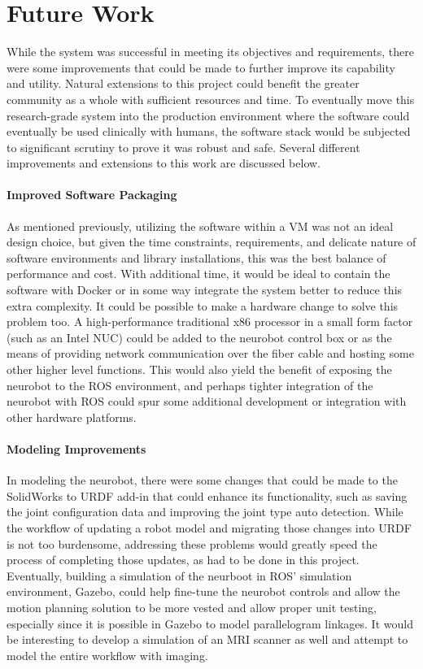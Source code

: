 \documentclass[12pt]{report}
\begin{document}
\chapter{Future Work}
\label{futureWork}
While the system was successful in meeting its objectives and requirements, there were some improvements that could be made to further improve its capability and utility. Natural extensions to this project could benefit the greater community as a whole with sufficient resources and time. To eventually move this research-grade system into the production environment where the software could eventually be used clinically with humans, the software stack would be subjected to significant scrutiny to prove it was robust and safe. Several different improvements and extensions to this work are discussed below.

\subsubsection{Improved Software Packaging}
As mentioned previously, utilizing the software within a VM was not an ideal design choice, but given the time constraints, requirements, and delicate nature of software environments and library installations, this was the best balance of performance and cost. With additional time, it would be ideal to contain the software with Docker or in some way integrate the system better to reduce this extra complexity. It could be possible to make a hardware change to solve this problem too. A high-performance traditional x86 processor in a small form factor (such as an Intel NUC) could be added to the neurobot control box or as the means of providing network communication over the fiber cable and hosting some other higher level functions. This would also yield the benefit of exposing the neurobot to the ROS environment, and perhaps tighter integration of the neurobot with ROS could spur some additional development or integration with other hardware platforms.

\subsubsection{Modeling Improvements}
In modeling the neurobot, there were some changes that could be made to the SolidWorks to URDF add-in that could enhance its functionality, such as saving the joint configuration data and improving the joint type auto detection. While the workflow of updating a robot model and migrating those changes into URDF is not too burdensome, addressing these problems would greatly speed the process of completing those updates, as had to be done in this project. Eventually, building a simulation of the neurboot in ROS' simulation environment, Gazebo, could help fine-tune the neurobot controls and allow the motion planning solution to be more vested and allow proper unit testing, especially since it is possible in Gazebo to model parallelogram linkages. It would be interesting to develop a simulation of an MRI scanner as well and attempt to model the entire workflow with imaging.
\end{document}

